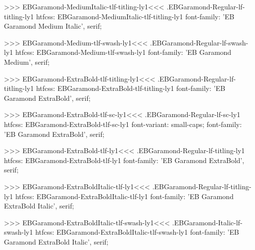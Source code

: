 {{>>>
\<EBGaramond-MediumItalic-tlf-titling-ly1\><<<
.EBGaramond-Regular-lf-titling-ly1
htfcss:  EBGaramond-MediumItalic-tlf-titling-ly1  font-family: 'EB Garamond Medium Italic', serif;

>>>
\<EBGaramond-Medium-tlf-swash-ly1\><<<
.EBGaramond-Regular-lf-swash-ly1
htfcss:  EBGaramond-Medium-tlf-swash-ly1  font-family: 'EB Garamond Medium', serif;

>>>
\<EBGaramond-ExtraBold-tlf-titling-ly1\><<<
.EBGaramond-Regular-lf-titling-ly1
htfcss:  EBGaramond-ExtraBold-tlf-titling-ly1  font-family: 'EB Garamond ExtraBold', serif;

>>>
\<EBGaramond-ExtraBold-tlf-sc-ly1\><<<
.EBGaramond-Regular-lf-sc-ly1
htfcss:  EBGaramond-ExtraBold-tlf-sc-ly1  font-variant: small-caps; font-family: 'EB Garamond ExtraBold', serif;

>>>
\<EBGaramond-ExtraBold-tlf-ly1\><<<
.EBGaramond-Regular-lf-titling-ly1
htfcss:  EBGaramond-ExtraBold-tlf-ly1  font-family: 'EB Garamond ExtraBold', serif;

>>>
\<EBGaramond-ExtraBoldItalic-tlf-ly1\><<<
.EBGaramond-Regular-lf-titling-ly1
htfcss:  EBGaramond-ExtraBoldItalic-tlf-ly1  font-family: 'EB Garamond ExtraBold Italic', serif;

>>>
\<EBGaramond-ExtraBoldItalic-tlf-swash-ly1\><<<
.EBGaramond-Italic-lf-swash-ly1
htfcss:  EBGaramond-ExtraBoldItalic-tlf-swash-ly1  font-family: 'EB Garamond ExtraBold Italic', serif;

}}
